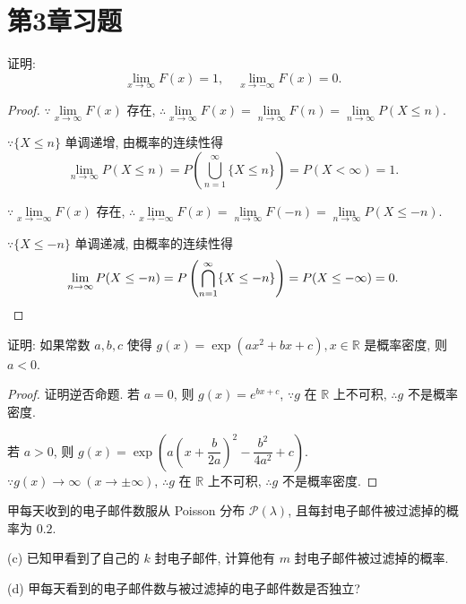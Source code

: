 \documentclass[color=black,device=normal,lang=cn]{elegantnote}
\numberwithin{equation}{section}
\theoremstyle{plain}
\newcounter{exsection}[section]
\numberwithin{exercise}{exsection}
\begin{document}
\section{第3章习题}
\addtocounter{exsection}{3}
\begin{exercise}%
    证明:
    \[\lim\limits_{x\to\infty}F(x)=1,\quad\lim\limits_{x\to-\infty}F(x)=0.\]
\end{exercise}
\begin{proof}
    $\because\lim\limits_{x\to\infty}F(x)$ 存在, $\therefore\lim\limits_{x\to\infty}F(x)=\lim\limits_{n\to\infty}F(n)=\lim\limits_{n\to\infty}P(X\leq n)$.

    $\because\{X\leq n\}$ 单调递增, 由概率的连续性得
    \[\lim\limits_{n\to\infty}P(X\leq n)=P\left(\bigcup\limits_{n=1}^\infty\{X\leq n\}\right)=P(X<\infty)=1.\]

    $\because\lim\limits_{x\to-\infty}F(x)$ 存在, $\therefore\lim\limits_{x\to-\infty}F(x)=\lim\limits_{n\to\infty}F(-n)=\lim\limits_{n\to\infty}P(X\leq-n)$.

    $\because\{X\leq-n\}$ 单调递减, 由概率的连续性得
    \[\lim\limits_{n\to\infty}P(X\leq-n)=P\left(\bigcap\limits_{n=1}^\infty\{X\leq-n\}\right)=P(X\leq-\infty)=0.\qedhere\]
\end{proof}
\begin{exercise}%
    证明: 如果常数 $a,b,c$ 使得 $g(x)=\exp(ax^2+bx+c),x\in\mathbb{R}$ 是概率密度, 则 $a<0$.
\end{exercise}
\newpage
\begin{proof}
    证明逆否命题. 若 $a=0$, 则 $g(x)=e^{bx+c}$, $\because g$ 在 $\mathbb{R}$ 上不可积, $\therefore g$ 不是概率密度.
    
    若 $a>0$, 则 $g(x)=\exp\left(a\left(x+\dfrac{b}{2a}\right)^2-\dfrac{b^2}{4a^2}+c\right)$. $\because g(x)\to\infty\ (x\to\pm\infty)$, $\therefore g$ 在 $\mathbb{R}$ 上不可积, $\therefore g$ 不是概率密度.
\end{proof}
\addtocounter{exercise}{6}
\begin{exercise}%
    甲每天收到的电子邮件数服从 Poisson 分布 $\mathcal{P}(\lambda)$, 且每封电子邮件被过滤掉的概率为 $0.2$.

    (c) 已知甲看到了自己的 $k$ 封电子邮件, 计算他有 $m$ 封电子邮件被过滤掉的概率.

    (d) 甲每天看到的电子邮件数与被过滤掉的电子邮件数是否独立?
\end{exercise}
\end{document}
